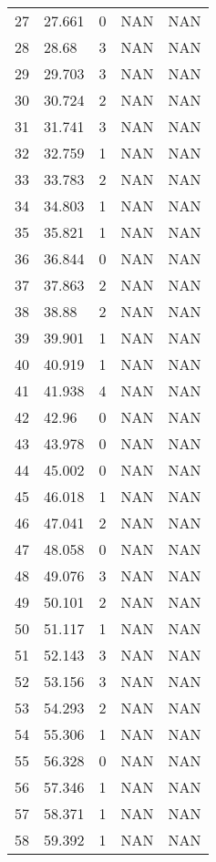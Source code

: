 \documentclass{article}
\begin{document}
\begin{longtable}{@{}lllll@{}}
				27  & 27.661  & 0    & NAN  & NAN  \\
				28  & 28.68   & 3    & NAN  & NAN  \\
				29  & 29.703  & 3    & NAN  & NAN  \\
				30  & 30.724  & 2    & NAN  & NAN  \\
				31  & 31.741  & 3    & NAN  & NAN  \\
				32  & 32.759  & 1    & NAN  & NAN  \\
				33  & 33.783  & 2    & NAN  & NAN  \\
				34  & 34.803  & 1    & NAN  & NAN  \\
				35  & 35.821  & 1    & NAN  & NAN  \\
				36  & 36.844  & 0    & NAN  & NAN  \\
				37  & 37.863  & 2    & NAN  & NAN  \\
				38  & 38.88   & 2    & NAN  & NAN  \\
				39  & 39.901  & 1    & NAN  & NAN  \\
				40  & 40.919  & 1    & NAN  & NAN  \\
				41  & 41.938  & 4    & NAN  & NAN  \\
				42  & 42.96   & 0    & NAN  & NAN  \\
				43  & 43.978  & 0    & NAN  & NAN  \\
				44  & 45.002  & 0    & NAN  & NAN  \\
				45  & 46.018  & 1    & NAN  & NAN  \\
				46  & 47.041  & 2    & NAN  & NAN  \\
				47  & 48.058  & 0    & NAN  & NAN  \\
				48  & 49.076  & 3    & NAN  & NAN  \\
				49  & 50.101  & 2    & NAN  & NAN  \\
				50  & 51.117  & 1    & NAN  & NAN  \\
				51  & 52.143  & 3    & NAN  & NAN  \\
				52  & 53.156  & 3    & NAN  & NAN  \\
				53  & 54.293  & 2    & NAN  & NAN  \\
				54  & 55.306  & 1    & NAN  & NAN  \\
				55  & 56.328  & 0    & NAN  & NAN  \\
				56  & 57.346  & 1    & NAN  & NAN  \\
				57  & 58.371  & 1    & NAN  & NAN  \\
				58  & 59.392  & 1    & NAN  & NAN  \\

\end{longtable}
\end{document}
